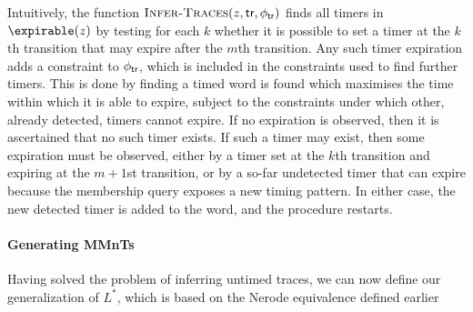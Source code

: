 Intuitively, the function
$\textsc{Infer-Traces}(z,\textsf{tr},\phi_{\textsf{tr}})$ finds
all timers in $\expirable(z)$ by testing for each $k$ whether 
it is possible
to set a timer at the $k$th transition that may expire after the
$m$th transition. Any such timer expiration adds a constraint to
$\phi_{\textsf{tr}}$, which is included in the constraints used to find
further timers.
This is done by finding a timed word is found which maximises the
time within which it is able to expire, subject to the constraints under
which other, already detected, timers cannot expire. If no expiration is
observed, then it is ascertained that no such timer exists.
If such a timer may exist, then some expiration must be observed, either
by a timer set at the $k$th transition and expiring at the $m+1$st transition,
or by a so-far undetected timer that can expire because the membership
query exposes a new timing pattern. In either case, the new detected timer
is added to the word, and the procedure restarts.

\paragraph{Generating MMnTs}
Having solved the problem of inferring untimed traces, we can now
define our generalization of $L^*$, which is based on the
Nerode equivalence defined earlier


